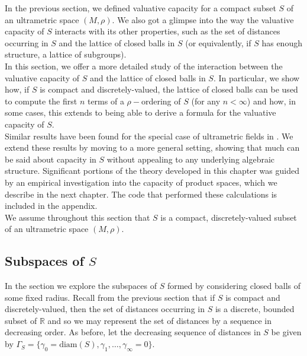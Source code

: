 
In the previous section, we defined valuative capacity for a compact subset $S$ of an ultrametric space $(M, \rho)$. We also got a glimpse into the way the valuative capacity of $S$ interacts with its other properties, such as the set of distances occurring in $S$ and the lattice of closed balls in $S$ (or equivalently, if $S$ has enough structure, a lattice of subgroups).\\

In this section, we offer a more detailed study of the interaction between the valuative capacity of $S$ and the lattice of closed balls in $S$. In particular, we  show how, if $S$ is compact and discretely-valued, the lattice of closed balls can be used to compute the first $n$ terms of a $\rho-$ordering of $S$ (for any $n < \infty$) and how, in some cases, this extends to being able to derive a formula for the valuative capacity of $S$.\\

Similar results have been found for the special case of ultrametric fields in \cite{cef}. We extend these results by moving to a more general setting, showing that much can be said about capacity in $S$ without appealing to any underlying algebraic structure. Significant portions of the theory developed in this chapter was guided by an empirical investigation into the capacity of product spaces, which we describe in the next chapter. The code that performed these calculations is included in the appendix.\\

We assume throughout this section that $S$ is a compact, discretely-valued subset of an ultrametric space $(M, \rho)$.\\

\subsection*{Subspaces of $S$}
In the section we explore the subspaces of $S$ formed by considering closed balls of some fixed radius.  Recall from the previous section that if $S$ is compact and discretely-valued, then the set of distances occurring in $S$ is a discrete, bounded subset of $\mathbb{R}$ and so we may represent the set of distances by a sequence in decreasing order. As before, let the decreasing sequence of distances in $S$ be given by  $\Gamma_S =\{\gamma_0=\text{diam}(S), \gamma_1,\ldots,\gamma_\infty=0\}$.\\

